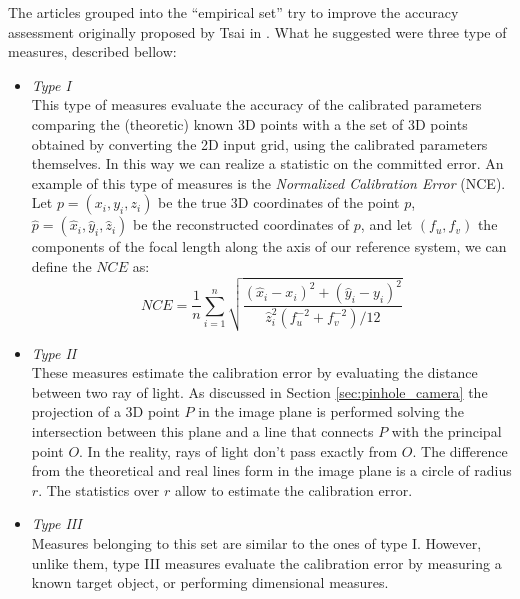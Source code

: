 The articles grouped into the ``empirical set'' try to improve the accuracy assessment originally proposed by Tsai in \cite{TsaiTvLenses}. What he suggested were three type of measures, described bellow:
  \begin{itemize}
    \item \textit{Type I} \\
          This type of measures evaluate the accuracy of the calibrated parameters comparing the (theoretic) known 3D points with a the set of 3D points obtained by converting the 2D input grid, using the calibrated parameters themselves. In this way we can realize a statistic on the committed error. An example of this type of measures is the \textit{Normalized Calibration Error} (\acs{NCE})\cite{159901}. Let $p = (x_i, y_i, z_i)$ be the true 3D coordinates of the point $p$, $\hat{p} = (\hat{x}_i, \hat{y}_i, \hat{z}_i)$ be the reconstructed coordinates of $p$, and let $\left( f_u, f_v \right)$ the components of the focal length along the axis of our reference system, we can define the $NCE$ as:
          \begin{equation*}
            NCE = \frac{1}{n}\sum_{i=1}^n \sqrt{\frac{(\hat{x}_i - x_i)^2 + (\hat{y}_i - y_i)^2}{\hat{z}_i^2(f_u^{-2} + f_v^{-2})/12}}
          \end{equation*}
          
    \item \textit{Type II} \\
    These measures estimate the calibration error by evaluating the distance between two ray of light. As discussed in Section \ref{sec:pinhole_camera} the projection of a 3D point $P$ in the image plane is performed solving the intersection between this plane and a line that connects $P$ with the principal point $O$. In the reality, rays of light don't pass exactly from $O$. The difference from the theoretical and real lines form in the image plane is a circle of radius $r$. The statistics over $r$ allow to estimate the calibration error.
    
    \item \textit{Type III} \\
Measures belonging to this set are similar to the ones of type I. However, unlike them, type III measures evaluate the calibration error by measuring a known target object, or performing dimensional measures.
  \end{itemize}
  
